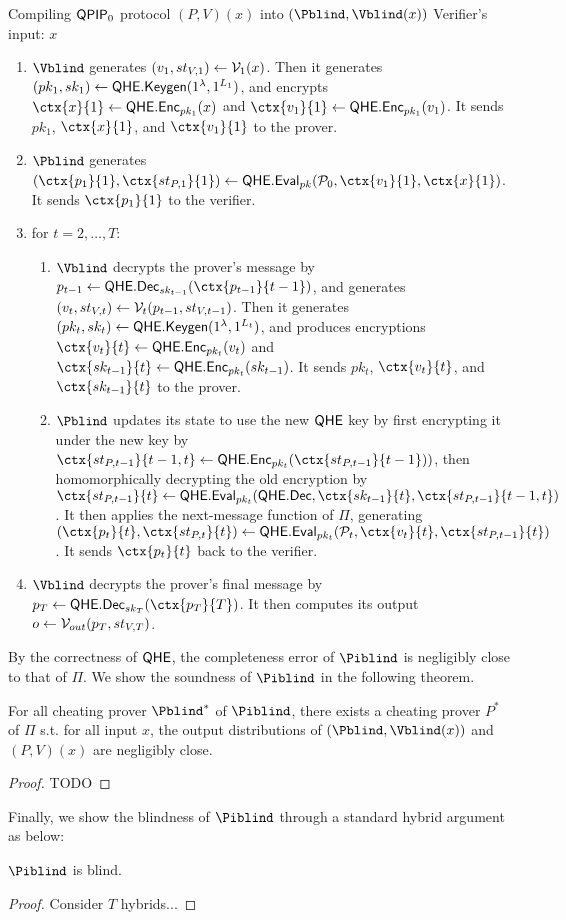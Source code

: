 \begin{protocol}{Compiling $\operatorname{\mathsf{QPIP}}_0$ protocol $(P, V)(x)$ into $(\Pblind, \Vblind(x))$}
	Verifier's input: $x$
	\begin{enumerate}
		\item $\Vblind$ generates $(v_1, st_{V, 1})\leftarrow\mathcal{V}_1(x)$.
			Then it generates $(pk_1, sk_1)\leftarrow\mathsf{QHE.Keygen}(1^\lambda, 1^{L_1})$,
			and encrypts $\ctx{x}{1}\leftarrow\QEnc_{pk_1}(x)$ and $\ctx{v_1}{1}\leftarrow\QEnc_{pk_1}(v_1)$.
			It sends $pk_1$, $\ctx{x}{1}$, and $\ctx{v_1}{1}$ to the prover.
		\item $\Pblind$ generates $(\ctx{p_1}{1}, \ctx{st_{P, 1}}{1})\leftarrow\QEval_{pk}(\cP_0, \ctx{v_1}{1}, \ctx{x}{1})$.
			It sends $\ctx{p_1}{1}$ to the verifier.
		\item for $t=2,\ldots,T$:
		\begin{enumerate}
			\item $\Vblind$ decrypts the prover's message by $p_{t-1}\leftarrow\QDec_{sk_{t-1}}(\ctx{p_{t-1}}{t-1})$,
				and generates $(v_t, st_{V, t})\leftarrow\mathcal{V}_t(p_{t-1}, st_{V, t-1})$.
				Then it generates $(pk_t, sk_t)\leftarrow\mathsf{QHE.Keygen}(1^\lambda, 1^{L_t})$,
				and produces encryptions $\ctx{v_t}{t}\leftarrow\QEnc_{pk_t}(v_t)$ and $\ctx{sk_{t-1}}{t}\leftarrow\QEnc_{pk_t}(sk_{t-1})$.
				It sends $pk_t$, $\ctx{v_t}{t}$, and $\ctx{sk_{t-1}}{t}$ to the prover.
			\item $\Pblind$ updates its state to use the new $\mathsf{QHE}$ key by
				first encrypting it under the new key by $\ctx{st_{P, t-1}}{t-1, t}\leftarrow\QEnc_{pk_t}(\ctx{st_{P, t-1}}{t-1}))$,
				then homomorphically decrypting the old encryption by
				$\ctx{st_{P, t-1}}{t}\leftarrow\QEval_{pk_t}(\QDec, \ctx{sk_{t-1}}{t}, \ctx{st_{P, t-1}}{t-1, t})$.
				It then applies the next-message function of $\Pi$, generating
				$(\ctx{p_t}{t}, \ctx{st_{P, t}}{t})\leftarrow\QEval_{pk_t}(\cP_t, \ctx{v_t}{t}, \ctx{st_{P, t-1}}{t})$.
				It sends $\ctx{p_t}{t}$ back to the verifier.
		\end{enumerate}
		\item $\Vblind$ decrypts the prover's final message by $p_T\leftarrow\QDec_{sk_T}(\ctx{p_T}{T})$.
			It then computes its output $o\leftarrow\mathcal{V}_{out}(p_T, st_{V, T})$.
	\end{enumerate}
\end{protocol}

By the correctness of $\mathsf{QHE}$, the completeness error of $\Piblind$ is negligibly close to that of $\Pi$.
We show the soundness of $\Piblind$ in the following theorem.

\begin{theorem}
	For all cheating prover $\Pblind^*$ of $\Piblind$, there exists a cheating prover $P^*$ of $\Pi$ s.t. for all input $x$, the output distributions of $(\Pblind, \Vblind(x))$ and $(P, V)(x)$ are negligibly close.
\end{theorem}
\begin{proof}
	TODO
\end{proof}

Finally, we show the blindness of $\Piblind$ through a standard hybrid argument as below:
\begin{theorem}
	$\Piblind$ is blind.
\end{theorem}
\begin{proof}
	Consider $T$ hybrids...
\end{proof}
